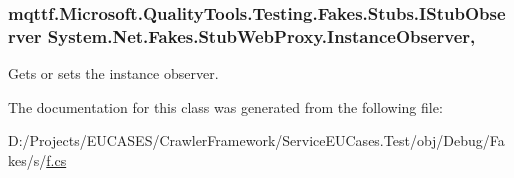\hypertarget{class_system_1_1_net_1_1_fakes_1_1_stub_web_proxy_a350da33c61ca314b1808d604bedb5527}{
\subsubsection[{Instance\-Observer}]{\setlength{\rightskip}{0pt plus 5cm}mqttf.\-Microsoft.\-Quality\-Tools.\-Testing.\-Fakes.\-Stubs.\-I\-Stub\-Observer System.\-Net.\-Fakes.\-Stub\-Web\-Proxy.\-Instance\-Observer\hspace{0.3cm}{\ttfamily [get]}, {\ttfamily [set]}}}\label{class_system_1_1_net_1_1_fakes_1_1_stub_web_proxy_a350da33c61ca314b1808d604bedb5527}


Gets or sets the instance observer.



The documentation for this class was generated from the following file\-:\begin{DoxyCompactItemize}
\item 
D\-:/\-Projects/\-E\-U\-C\-A\-S\-E\-S/\-Crawler\-Framework/\-Service\-E\-U\-Cases.\-Test/obj/\-Debug/\-Fakes/s/\hyperlink{s_2f_8cs}{f.\-cs}\end{DoxyCompactItemize}
